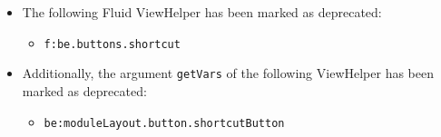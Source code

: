 \begin{frame}[fragile]
\begin{itemize}
		\item The following Fluid ViewHelper has been marked as deprecated:

			\begin{itemize}\smaller
				\item \texttt{f:be.buttons.shortcut}
			\end{itemize}\normalsize

		\item Additionally, the argument \texttt{getVars} of the following ViewHelper
			has been marked as deprecated:

			\begin{itemize}\smaller
				\item \texttt{be:moduleLayout.button.shortcutButton}
			\end{itemize}\normalsize

	\end{itemize}

\end{frame}

